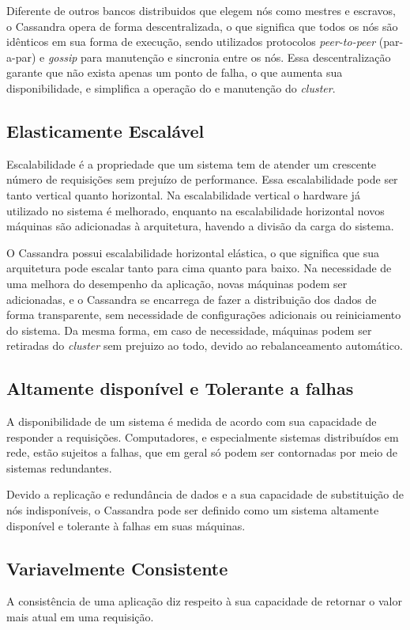 Diferente de outros bancos distribuidos que elegem nós como mestres e escravos, o Cassandra opera de forma descentralizada, o que significa que todos os nós são idênticos em sua forma de execução, sendo utilizados protocolos \emph{peer-to-peer} (par-a-par) e \emph{gossip} para manutenção e sincronia entre os nós. Essa descentralização garante que não exista apenas um ponto de falha, o que aumenta sua disponibilidade, e simplifica a operação do e manutenção do \emph{cluster}.

\subsection*{Elasticamente Escalável}
Escalabilidade é a propriedade que um sistema tem de atender um crescente número de requisições sem prejuízo de performance. Essa escalabilidade pode ser tanto vertical quanto horizontal. Na escalabilidade vertical o hardware já utilizado no sistema é melhorado, enquanto na escalabilidade horizontal novos máquinas são adicionadas à arquitetura, havendo a divisão da carga do sistema.

O Cassandra possui escalabilidade horizontal elástica, o que significa que sua arquitetura pode escalar tanto para cima quanto para baixo. Na necessidade de uma melhora do desempenho da aplicação, novas máquinas podem ser adicionadas, e o Cassandra se encarrega de fazer a distribuição dos dados de forma transparente, sem necessidade de configurações adicionais ou reiniciamento do sistema. Da mesma forma, em caso de necessidade, máquinas podem ser retiradas do \emph{cluster} sem prejuizo ao todo, devido ao rebalanceamento automático.

\subsection*{Altamente disponível e Tolerante a falhas}
A disponibilidade de um sistema é medida de acordo com sua capacidade de responder a requisições. Computadores, e especialmente sistemas distribuídos em rede, estão sujeitos a falhas, que em geral só podem ser contornadas por meio de sistemas redundantes.

Devido a replicação e redundância de dados e a sua capacidade de substituição de nós indisponíveis, o Cassandra pode ser definido como um sistema altamente disponível e tolerante à falhas em suas máquinas.

\subsection*{Variavelmente Consistente}
A consistência de uma aplicação diz respeito à sua capacidade de retornar o valor mais atual em uma requisição.


